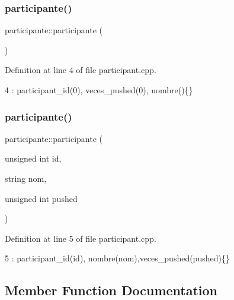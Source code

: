 \subsubsection{\texorpdfstring{participante()}{participante()}\hspace{0.1cm}{\footnotesize\ttfamily [1/2]}}
{\footnotesize\ttfamily participante\+::participante (\begin{DoxyParamCaption}{ }\end{DoxyParamCaption})}



Definition at line 4 of file participant.\+cpp.


\begin{DoxyCode}
4 : participant\_id(0), veces\_pushed(0), nombre()\{\}
\end{DoxyCode}
\mbox{\label{classparticipante_a585a21b68cdaf42e2c4e14db840eacef}} 
\subsubsection{\texorpdfstring{participante()}{participante()}\hspace{0.1cm}{\footnotesize\ttfamily [2/2]}}
{\footnotesize\ttfamily participante\+::participante (\begin{DoxyParamCaption}\item[{unsigned int}]{id,  }\item[{string}]{nom,  }\item[{unsigned int}]{pushed }\end{DoxyParamCaption})}



Definition at line 5 of file participant.\+cpp.


\begin{DoxyCode}
5 : participant\_id(\textcolor{keywordtype}{id}), nombre(nom),veces\_pushed(pushed)\{\}
\end{DoxyCode}


\subsection{Member Function Documentation}
\mbox{\label{classparticipante_a00d27dd27a5bf61677c8dfc8937e1b43}} 
